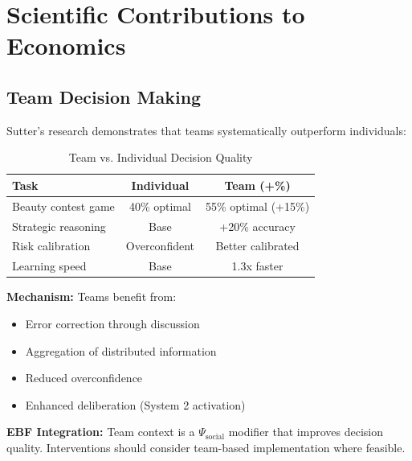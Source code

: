 \section{Scientific Contributions to Economics}
\label{sec:sut-economics}

\subsection{Team Decision Making}
\label{sec:sut-teams}

Sutter's research demonstrates that teams systematically outperform individuals:

\begin{table}[htbp]
\centering
\caption{Team vs. Individual Decision Quality}
\label{tab:sut-teams}
\begin{tabular}{@{}lcc@{}}
\toprule
\textbf{Task} & \textbf{Individual} & \textbf{Team (+\%)} \\
\midrule
Beauty contest game & 40\% optimal & 55\% optimal (+15\%) \\
Strategic reasoning & Base & +20\% accuracy \\
Risk calibration & Overconfident & Better calibrated \\
Learning speed & Base & 1.3x faster \\
\bottomrule
\end{tabular}
\end{table}

\textbf{Mechanism:} Teams benefit from:
\begin{itemize}[nosep]
    \item Error correction through discussion
    \item Aggregation of distributed information
    \item Reduced overconfidence
    \item Enhanced deliberation (System 2 activation)
\end{itemize}

\textbf{EBF Integration:} Team context is a $\Psi_{\text{social}}$ modifier
that improves decision quality. Interventions should consider team-based
implementation where feasible.


